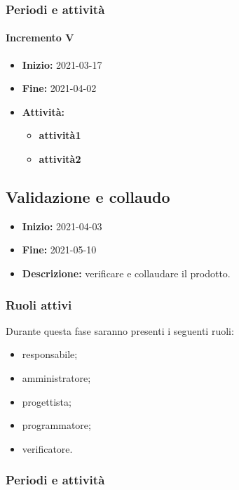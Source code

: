 \subsubsection{Periodi e attività}

\paragraph[Incremento V]{Incremento V}
\begin{itemize}
    \item [] \textbf{Inizio:} 2021-03-17
    \item [] \textbf{Fine:} 2021-04-02
    \item [] \textbf{Attività:}
          \begin{itemize}
            \item \textbf{attività1}
            \item \textbf{attività2}
          \end{itemize}
\end{itemize}


\subsection{Validazione e collaudo} \label{_pianificazioneValidazioneCollaudo}
\begin{itemize}
    \item [] \textbf{Inizio:} 2021-04-03
    \item [] \textbf{Fine:} 2021-05-10
    \item [] \textbf{Descrizione:} verificare e collaudare il prodotto.
\end{itemize}

\subsubsection{Ruoli attivi}
Durante questa fase saranno presenti i seguenti ruoli:
\begin{itemize}
    \item responsabile;
    \item amministratore;
    \item progettista;
    \item programmatore;
    \item verificatore.
\end{itemize}

\subsubsection{Periodi e attività}

